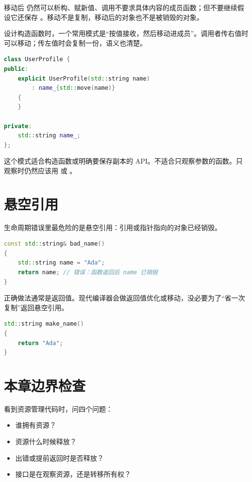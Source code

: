 移动后  仍然可以析构、赋新值、调用不要求具体内容的成员函数；但不要继续假设它还保存 。移动不是复制，移动后的对象也不是被销毁的对象。

设计构造函数时，一个常用模式是“按值接收，然后移动进成员”。调用者传右值时可以移动；传左值时会复制一份，语义也清楚。

\begin{lstlisting}[language=C++,caption={按值接收并移动进成员}]
class UserProfile {
public:
    explicit UserProfile(std::string name)
        : name_{std::move(name)}
    {
    }

private:
    std::string name_;
};
\end{lstlisting}

这个模式适合构造函数或明确要保存副本的 API。不适合只观察参数的函数。只观察时仍然应该用  或 。

\section{悬空引用}

生命周期错误里最危险的是悬空引用：引用或指针指向的对象已经销毁。

\begin{lstlisting}[language=C++,caption={返回局部变量引用是错误}]
const std::string& bad_name()
{
    std::string name = "Ada";
    return name; // 错误：函数返回后 name 已销毁
}
\end{lstlisting}

正确做法通常是返回值。现代编译器会做返回值优化或移动，没必要为了“省一次复制”返回悬空引用。

\begin{lstlisting}[language=C++,caption={返回值拥有自己的生命周期}]
std::string make_name()
{
    return "Ada";
}
\end{lstlisting}

\section{本章边界检查}

看到资源管理代码时，问四个问题：

\begin{itemize}
  \item 谁拥有资源？
  \item 资源什么时候释放？
  \item 出错或提前返回时是否释放？
  \item 接口是在观察资源，还是转移所有权？
\end{itemize}

